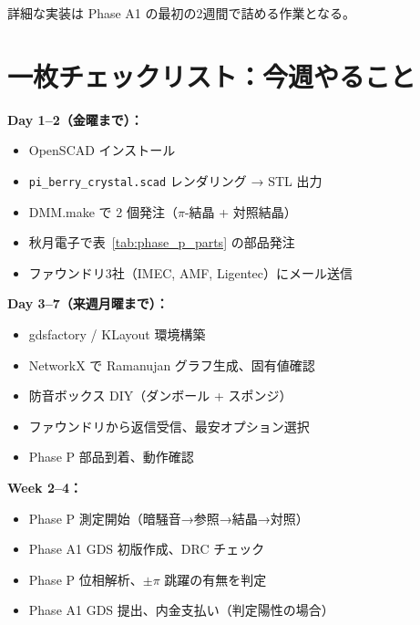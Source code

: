 \documentclass[11pt,a4paper]{article}
\begin{document}
詳細な実装は Phase A1 の最初の2週間で詰める作業となる。

\section{一枚チェックリスト：今週やること}

\begin{tcolorbox}[colback=yellow!5,colframe=orange!60!black,
  title=★ 今週のアクション ★]
\textbf{Day 1--2（金曜まで）：}
\begin{itemize}[nosep]
  \item[$\square$] OpenSCAD インストール
  \item[$\square$] \texttt{pi\_berry\_crystal.scad} レンダリング → STL 出力
  \item[$\square$] DMM.make で 2 個発注（$\pi$-結晶 + 対照結晶）
  \item[$\square$] 秋月電子で表~\ref{tab:phase_p_parts} の部品発注
  \item[$\square$] ファウンドリ3社（IMEC, AMF, Ligentec）にメール送信
\end{itemize}

\textbf{Day 3--7（来週月曜まで）：}
\begin{itemize}[nosep]
  \item[$\square$] gdsfactory / KLayout 環境構築
  \item[$\square$] NetworkX で Ramanujan グラフ生成、固有値確認
  \item[$\square$] 防音ボックス DIY（ダンボール + スポンジ）
  \item[$\square$] ファウンドリから返信受信、最安オプション選択
  \item[$\square$] Phase P 部品到着、動作確認
\end{itemize}

\textbf{Week 2--4：}
\begin{itemize}[nosep]
  \item[$\square$] Phase P 測定開始（暗騒音→参照→結晶→対照）
  \item[$\square$] Phase A1 GDS 初版作成、DRC チェック
  \item[$\square$] Phase P 位相解析、$\pm\pi$ 跳躍の有無を判定
  \item[$\square$] Phase A1 GDS 提出、内金支払い（判定陽性の場合）
\end{itemize}
\end{tcolorbox}
\end{document}
